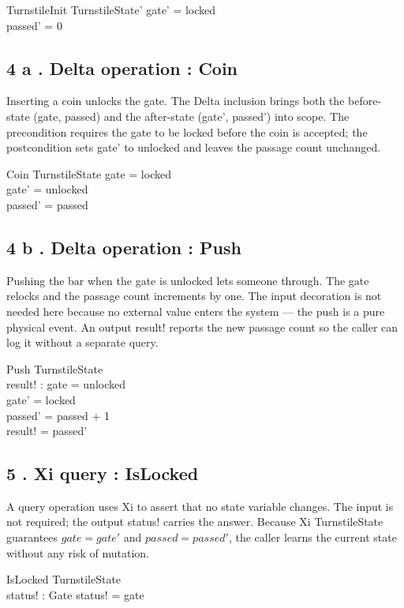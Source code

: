 \documentclass[a4paper,10pt,fleqn]{article}
\begin{document}
\begin{schema}{TurnstileInit}
TurnstileState'
\where
gate' = locked \\
passed' = 0
\end{schema}

\subsection*{4 a . Delta operation : Coin}

\noindent Inserting a coin unlocks the gate.  The Delta inclusion brings both the before-state (gate, passed) and the after-state (gate', passed') into scope.  The precondition requires the gate to be locked before the coin is accepted; the postcondition sets gate' to unlocked and leaves the passage count unchanged.

\bigskip

\begin{schema}{Coin}
\Delta TurnstileState
\where
gate = locked \\
gate' = unlocked \\
passed' = passed
\end{schema}

\subsection*{4 b . Delta operation : Push}

\noindent Pushing the bar when the gate is unlocked lets someone through. The gate relocks and the passage count increments by one.  The input decoration is not needed here because no external value enters the system --- the push is a pure physical event.  An output result! reports the new passage count so the caller can log it without a separate query.

\bigskip

\begin{schema}{Push}
\Delta TurnstileState \\
result! : \nat
\where
gate = unlocked \\
gate' = locked \\
passed' = passed + 1 \\
result! = passed'
\end{schema}

\subsection*{5 . Xi query : IsLocked}

\noindent A query operation uses Xi to assert that no state variable changes. The input is not required; the output status! carries the answer. Because Xi TurnstileState guarantees $gate = gate'$ and $passed = passed'$, the caller learns the current state without any risk of mutation.

\bigskip

\begin{schema}{IsLocked}
\Xi TurnstileState \\
status! : Gate
\where
status! = gate
\end{schema}
\end{document}
